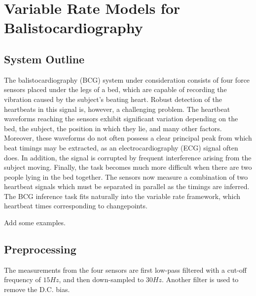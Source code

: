 \documentclass{article}
\begin{document}
\section{Variable Rate Models for Balistocardiography}

\subsection{System Outline}

The balistocardiography (BCG) system under consideration consists of four force sensors placed under the legs of a bed, which are capable of recording the vibration caused by the subject's beating heart. Robust detection of the heartbeats in this signal is, however, a challenging problem. The heartbeat waveforms reaching the sensors exhibit significant variation depending on the bed, the subject, the position in which they lie, and many other factors. Moreover, these waveforms do not often possess a clear principal peak from which beat timings may be extracted, as an electrocardiography (ECG) signal often does. In addition, the signal is corrupted by frequent interference arising from the subject moving. Finally, the task becomes much more difficult when there are two people lying in the bed together. The sensors now measure a combination of two heartbeat signals which must be separated in parallel as the timings are inferred. The BCG inference task fits naturally into the variable rate framework, which heartbeat times corresponding to changepoints.

{\meta Add some examples.}

\subsection{Preprocessing}

The measurements from the four sensors are first low-pass filtered with a cut-off frequency of $15Hz$, and then down-sampled to $30Hz$. Another filter is used to remove the D.C. bias.
\end{document}
